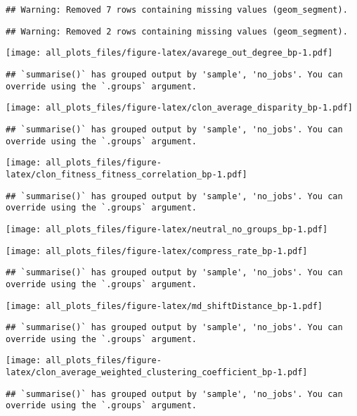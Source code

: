 \documentclass[
]{article}
\begin{document}
\begin{verbatim}
## Warning: Removed 7 rows containing missing values (geom_segment).
\end{verbatim}

\begin{verbatim}
## Warning: Removed 2 rows containing missing values (geom_segment).
\end{verbatim}

\texttt{[image: all\_plots\_files/figure-latex/avarege\_out\_degree\_bp-1.pdf]}

\begin{verbatim}
## `summarise()` has grouped output by 'sample', 'no_jobs'. You can override using the `.groups` argument.
\end{verbatim}

\texttt{[image: all\_plots\_files/figure-latex/clon\_average\_disparity\_bp-1.pdf]}

\begin{verbatim}
## `summarise()` has grouped output by 'sample', 'no_jobs'. You can override using the `.groups` argument.
\end{verbatim}

\texttt{[image: all\_plots\_files/figure-latex/clon\_fitness\_fitness\_correlation\_bp-1.pdf]}

\begin{verbatim}
## `summarise()` has grouped output by 'sample', 'no_jobs'. You can override using the `.groups` argument.
\end{verbatim}

\texttt{[image: all\_plots\_files/figure-latex/neutral\_no\_groups\_bp-1.pdf]}

\texttt{[image: all\_plots\_files/figure-latex/compress\_rate\_bp-1.pdf]}

\begin{verbatim}
## `summarise()` has grouped output by 'sample', 'no_jobs'. You can override using the `.groups` argument.
\end{verbatim}

\texttt{[image: all\_plots\_files/figure-latex/md\_shiftDistance\_bp-1.pdf]}

\begin{verbatim}
## `summarise()` has grouped output by 'sample', 'no_jobs'. You can override using the `.groups` argument.
\end{verbatim}

\texttt{[image: all\_plots\_files/figure-latex/clon\_average\_weighted\_clustering\_coefficient\_bp-1.pdf]}

\begin{verbatim}
## `summarise()` has grouped output by 'sample', 'no_jobs'. You can override using the `.groups` argument.
\end{verbatim}
\end{document}

